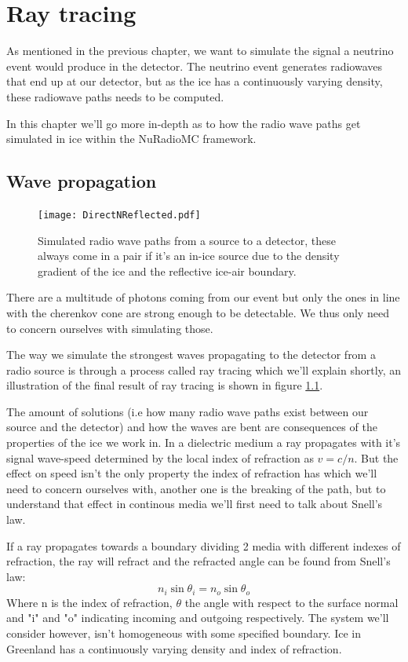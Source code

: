\chapter{Ray tracing}
\label{chap:RT}
As mentioned in the previous chapter, we want to simulate the signal a neutrino event
would produce in the detector. The neutrino event generates radiowaves that end
up at our detector, but as the ice has a continuously varying density, these radiowave
paths needs to be computed.

In this chapter we'll go more in-depth as to how the radio wave paths get
simulated in ice within the NuRadioMC framework.
\section{Wave propagation}
\begin{figure}[h!]
	\centering
	\texttt{[image: DirectNReflected.pdf]}
	\label{fig:PathIllu}
	\caption{Simulated radio wave paths from a source to a detector, these always come in a pair 
	if it's an in-ice source due to the density gradient of the ice and the reflective ice-air boundary.}
\end{figure}
There are a multitude of photons coming from our event but only the ones
in line with the cherenkov cone are strong enough to be detectable.
We thus only need to concern ourselves with simulating those.

The way we simulate the strongest waves propagating to the detector from a
radio source is through a process called ray tracing which we'll explain shortly, 
an illustration of the final result of ray tracing is shown in figure \ref{fig:PathIllu}.  

The amount of solutions (i.e how many radio wave paths exist between our source and the detector)
and how the waves are bent are consequences of the
properties of the ice we work in.  In a dielectric medium a ray propagates with
it's signal wave-speed determined by the local index of refraction as $v =
c/n$. But the effect on speed isn't the only property the index of refraction has
which we'll need to concern ourselves with, another one is the breaking of the path,
but to understand that effect in continous media we'll first need to talk about Snell's law. 

If a ray propagates towards a boundary dividing 2 media with different indexes
of refraction, the ray will refract and the refracted angle can be found from
Snell's law:
\begin{equation}
	n_i\sin{\theta_i} = n_o\sin{\theta_o}
\end{equation}
Where n is the index of refraction, $\theta$ the angle with respect to the
surface normal and "i" and "o" indicating incoming and outgoing respectively.
The system we'll consider however, isn't homogeneous with some specified
boundary. Ice in Greenland has a continuously varying density and
index of refraction.

